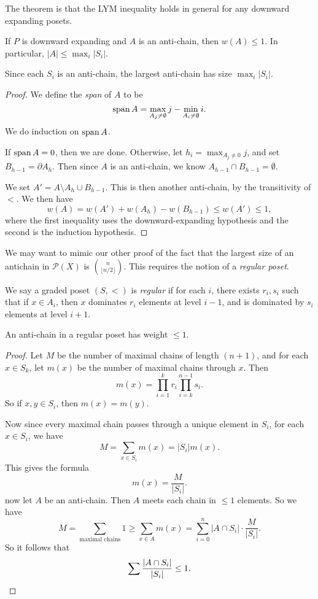 \documentclass[a4paper]{article}
\begin{document}
The theorem is that the LYM inequality holds in general for any downward expanding posets.
\begin{thm}
  If $P$ is downward expanding and $A$ is an anti-chain, then $w(A) \leq 1$. In particular, $|A| \leq \max_i |S_i|$.

  Since each $S_i$ is an anti-chain, the largest anti-chain has size $\max_i |S_i|$.
\end{thm}

\begin{proof}
  We define the \emph{span} of $A$ to be
  \[
    \operatorname{span} A = \max_{A_j \not= \emptyset} j - \min_{A_i \not= \emptyset} i.
  \]
  We do induction on $\operatorname{span} A$.

  If $\operatorname{span} A = 0$, then we are done. Otherwise, let $h_i = \max_{A_j \not= 0} j$, and set $B_{h - 1} = \partial A_h$. Then since $A$ is an anti-chain, we know $A_{h - 1} \cap B_{h - 1} = \emptyset$.

  We set $A' = A \setminus A_h \cup B_{h - 1}$. This is then another anti-chain, by the transitivity of $<$. We then have
  \[
    w(A) = w(A') + w(A_h) - w(B_{h - 1}) \leq w(A') \leq 1,
  \]
  where the first inequality uses the downward-expanding hypothesis and the second is the induction hypothesis.
\end{proof}

We may want to mimic our other proof of the fact that the largest size of an antichain in $\mathcal{P}(X)$ is $\binom{n}{\lfloor n/2\rfloor}$. This requires the notion of a \emph{regular poset}.

\begin{defi}
  We say a graded poset $(S, <)$ is \emph{regular} if for each $i$, there exists $r_i, s_i$ such that if $x \in A_i$, then $x$ dominates $r_i$ elements at level $i - 1$, and is dominated by $s_i$ elements at level $i + 1$.
\end{defi}

\begin{prop}
  An anti-chain in a regular poset has weight $\leq 1$.
\end{prop}

\begin{proof}
  Let $M$ be the number of maximal chains of length $(n + 1)$, and for each $x \in S_k$, let $m(x)$ be the number of maximal chains through $x$. Then
  \[
    m(x) = \prod_{i = 1}^k r_i \prod_{i = k}^{n - 1} s_i.
  \]
  So if $x, y \in S_i$, then $m(x) = m(y)$.

  Now since every maximal chain passes through a unique element in $S_i$, for each $x \in S_i$, we have
  \[
    M = \sum_{x \in S_i} m(x) = |S_i| m(x).
  \]
  This gives the formula
  \[
    m(x) = \frac{M}{|S_i|}.
  \]
  now let $A$ be an anti-chain. Then $A$ meets each chain in $\leq 1$ elements. So we have
  \[
    M = \sum_{\text{maximal chains}} 1 \geq \sum_{x \in A} m(x) = \sum_{i = 0}^n |A \cap S_i| \cdot \frac{M}{|S_i|}.
  \]
  So it follows that
  \[
    \sum \frac{|A \cap S_i|}{|S_i|} \leq 1.\qedhere
  \]
\end{proof}
\end{document}
